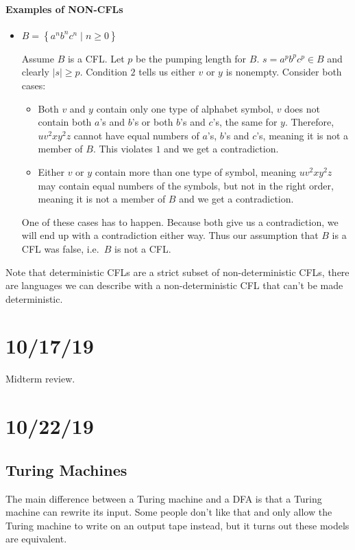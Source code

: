 \documentclass[12 pt]{article}
\begin{document}
\paragraph{Examples of NON-CFLs}
\begin{itemize}
\item $B = \left\{a^nb^nc^n \mid n \geq 0\right\}$

  Assume $B$ is a CFL. Let $p$ be the pumping length for $B$. $s =
  a^pb^pc^p \in B$ and clearly $|s| \geq p$. Condition $2$ tells us
  either $v$ or $y$ is nonempty. Consider both cases:
  \begin{itemize}
  \item Both $v$ and $y$ contain only one type of alphabet symbol, $v$
    does not contain both $a$'s and $b$'s or both $b$'s and $c$'s, the
    same for $y$. Therefore, $uv^2xy^2z$ cannot have equal numbers of
    $a$'s, $b$'s and $c$'s, meaning it is not a member of $B$. This
    violates $1$ and we get a contradiction.
  \item Either $v$ or $y$ contain more than one type of symbol,
    meaning $uv^2xy^2z$ may contain equal numbers of the symbols, but
    not in the right order, meaning it is not a member of $B$ and we
    get a contradiction.
  \end{itemize}
  One of these cases has to happen. Because both give us a
  contradiction, we will end up with a contradiction either way. Thus
  our assumption that $B$ is a CFL was false, i.e.\ $B$ is not a CFL.
\end{itemize}

Note that deterministic CFLs are a strict subset of non-deterministic
CFLs, there are languages we can describe with a non-deterministic CFL
that can't be made deterministic.
\section{10/17/19}
Midterm review.
\section{10/22/19}
\subsection{Turing Machines}
The main difference between a Turing machine and a DFA is that a
Turing machine can rewrite its input. Some people don't like that and
only allow the Turing machine to write on an output tape instead, but
it turns out these models are equivalent.
\end{document}

